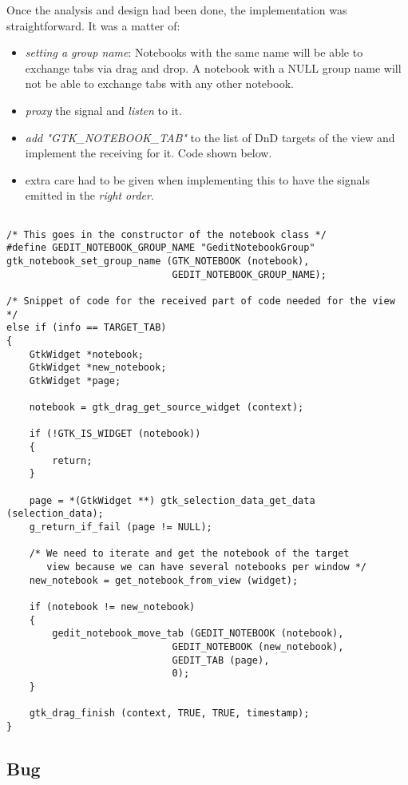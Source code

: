Once the analysis and design had been done, the implementation was straightforward.   It was a matter of:
\begin{itemize}
  \item \emph{setting a group name}: Notebooks with the same name will be able to exchange tabs via drag and drop. A notebook with a NULL group name will not be able to exchange tabs with any other notebook.
  \item \emph{proxy} the signal and \emph{listen} to it.
  \item \emph{add "GTK\_NOTEBOOK\_TAB"} to the list of DnD targets of the view and implement the receiving for it. Code shown below.
  \item extra care had to be  given  when implementing this to have the signals emitted in the \emph{right order}.
\end{itemize}

\begin{lstlisting}[style=GObject]

/* This goes in the constructor of the notebook class */
#define GEDIT_NOTEBOOK_GROUP_NAME "GeditNotebookGroup"
gtk_notebook_set_group_name (GTK_NOTEBOOK (notebook),
                             GEDIT_NOTEBOOK_GROUP_NAME);

/* Snippet of code for the received part of code needed for the view */
else if (info == TARGET_TAB)
{
	GtkWidget *notebook;
	GtkWidget *new_notebook;
	GtkWidget *page;

	notebook = gtk_drag_get_source_widget (context);

	if (!GTK_IS_WIDGET (notebook))
	{
		return;
	}

	page = *(GtkWidget **) gtk_selection_data_get_data (selection_data);
	g_return_if_fail (page != NULL);

	/* We need to iterate and get the notebook of the target
	   view because we can have several notebooks per window */
	new_notebook = get_notebook_from_view (widget);

	if (notebook != new_notebook)
	{
		gedit_notebook_move_tab (GEDIT_NOTEBOOK (notebook),
			                 GEDIT_NOTEBOOK (new_notebook),
			                 GEDIT_TAB (page),
			                 0);
	}

	gtk_drag_finish (context, TRUE, TRUE, timestamp);
}

\end{lstlisting}

\subsection{Bug}

